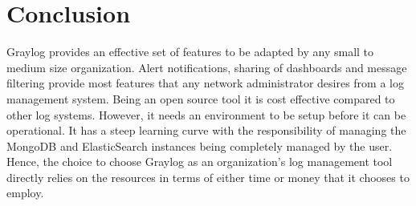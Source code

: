 \documentclass[9pt,twocolumn,twoside]{../../styles/osajnl}
\begin{document}
\section{Conclusion}
Graylog provides an effective set of features to be adapted by any
small to medium size organization. Alert notifications, sharing of
dashboards and message filtering provide most features that any
network administrator desires from a log management system. Being an
open source tool it is cost effective compared to other log
systems. However, it needs an environment to be setup before it can be
operational. It has a steep learning curve with the responsibility of
managing the MongoDB and ElasticSearch instances being completely
managed by the user.  Hence, the choice to choose Graylog as an
organization's log management tool directly relies on the resources
in terms of either time or money that it chooses to employ.




\end{document}
